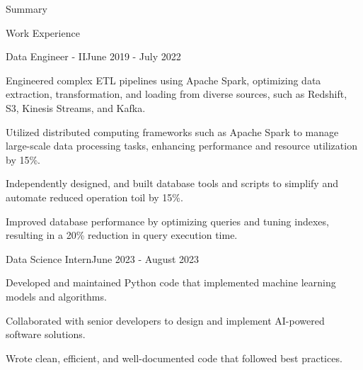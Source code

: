 \documentclass{resume} %
\begin{document}
    \begin{rSection}{Summary}
        {}
    \end{rSection}

    \begin{rSection}{Work Experience}
                    \begin{rSubsection}
                {Data Engineer {-} II}{June 2019 - July 2022}
                                    {}
                                {}
                                    \item Engineered complex ETL pipelines using Apache Spark, optimizing data extraction, transformation, and loading from diverse sources, such as Redshift, S3, Kinesis Streams, and Kafka.
                                    \item Utilized distributed computing frameworks such as Apache Spark to manage large{-}scale data processing tasks, enhancing performance and resource utilization by 15\%.
                                    \item Independently designed, and built database tools and scripts to simplify and automate reduced operation toil by 15\%.
                                    \item Improved database performance by optimizing queries and tuning indexes, resulting in a 20\% reduction in query execution time.
                            \end{rSubsection}
                    \begin{rSubsection}
                {Data Science Intern}{June 2023 - August 2023}
                                    {}
                                {}
                                    \item Developed and maintained Python code that implemented machine learning models and algorithms.
                                    \item Collaborated with senior developers to design and implement AI{-}powered software solutions.
                                    \item Wrote clean, efficient, and well{-}documented code that followed best practices.
                            \end{rSubsection}
            \end{rSection}
\end{document}
